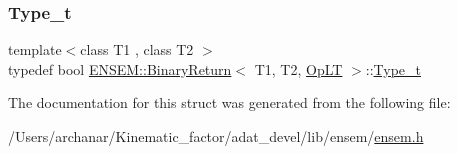 \mbox{\label{structENSEM_1_1BinaryReturn_3_01T1_00_01T2_00_01OpLT_01_4_a5617c2e3cf4124ac0b4d777ae1a195ec}} 
\subsubsection{\texorpdfstring{Type\_t}{Type\_t}\hspace{0.1cm}{\footnotesize\ttfamily [2/2]}}
{\footnotesize\ttfamily template$<$class T1 , class T2 $>$ \\
typedef bool \mbox{\hyperlink{structENSEM_1_1BinaryReturn}{E\+N\+S\+E\+M\+::\+Binary\+Return}}$<$ T1, T2, \mbox{\hyperlink{structENSEM_1_1OpLT}{Op\+LT}} $>$\+::\mbox{\hyperlink{structENSEM_1_1BinaryReturn_3_01T1_00_01T2_00_01OpLT_01_4_a5617c2e3cf4124ac0b4d777ae1a195ec}{Type\+\_\+t}}}



The documentation for this struct was generated from the following file\+:\begin{DoxyCompactItemize}
\item 
/\+Users/archanar/\+Kinematic\+\_\+factor/adat\+\_\+devel/lib/ensem/\mbox{\hyperlink{lib_2ensem_2ensem_8h}{ensem.\+h}}\end{DoxyCompactItemize}
